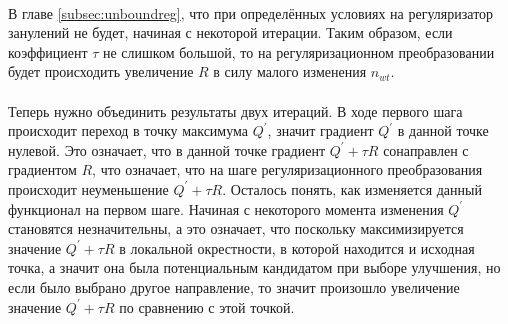\documentclass[12pt]{article}
\begin{document}
\ \\
В главе \ref{subsec:unboundreg}, что при определённых условиях на регуляризатор занулений не будет, начиная с некоторой итерации. Таким образом, если коэффициент $\tau$ не слишком большой, то на регуляризационном преобразовании будет происходить увеличение $R$ в силу малого изменения $n_{wt}$.\\
\ \\
Теперь нужно объединить результаты двух итераций. В ходе первого шага происходит переход в точку максимума $Q^{\prime}$, значит градиент $Q^{\prime}$ в данной точке нулевой. Это означает, что в данной точке градиент $Q^{\prime} + \tau R$ сонаправлен с градиентом $R$, что означает, что на шаге регуляризационного преобразования происходит неуменьшение $Q^{\prime} + \tau R$. Осталось понять, как изменяется данный функционал на первом шаге. Начиная с некоторого момента изменения $Q^{\prime}$ становятся незначительны, а это означает, что поскольку максимизируется значение $Q^{\prime} + \tau R$ в локальной окрестности, в которой находится и исходная точка, а значит она была потенциальным кандидатом при выборе улучшения, но если было выбрано другое направление, то значит произошло увеличение значение $Q^{\prime} + \tau R$ по сравнению с этой точкой.\\
\end{document}
